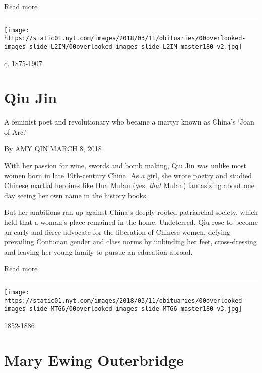 \href{https://www.nytimes.com/interactive/2018/obituaries/overlooked-ida-b-wells.html}{Read
more}

\begin{center}\rule{0.5\linewidth}{\linethickness}\end{center}

\texttt{[image: https://static01.nyt.com/images/2018/03/11/obituaries/00overlooked-images-slide-L2IM/00overlooked-images-slide-L2IM-master180-v2.jpg]}

c. 1875-1907

\hypertarget{qiu-jin}{%
\section{Qiu Jin}\label{qiu-jin}}

A feminist poet and revolutionary who became a martyr known as China's
`Joan of Arc.'

By AMY QIN MARCH 8, 2018

With her passion for wine, swords and bomb making, Qiu Jin was unlike
most women born in late 19th-century China. As a girl, she wrote poetry
and studied Chinese martial heroines like Hua Mulan (yes,
\href{https://www.imdb.com/title/tt0120762/}{\emph{that} Mulan})
fantasizing about one day seeing her own name in the history books.

But her ambitions ran up against China's deeply rooted patriarchal
society, which held that a woman's place remained in the home.
Undeterred, Qiu rose to become an early and fierce advocate for the
liberation of Chinese women, defying prevailing Confucian gender and
class norms by unbinding her feet, cross-dressing and leaving her young
family to pursue an education abroad.

\href{https://www.nytimes.com/interactive/2018/obituaries/overlooked-qiu-jin.html}{Read
more}

\begin{center}\rule{0.5\linewidth}{\linethickness}\end{center}

\texttt{[image: https://static01.nyt.com/images/2018/03/11/obituaries/00overlooked-images-slide-MTG6/00overlooked-images-slide-MTG6-master180-v3.jpg]}

1852-1886

\hypertarget{mary-ewing-outerbridge}{%
\section{Mary Ewing Outerbridge}\label{mary-ewing-outerbridge}}

